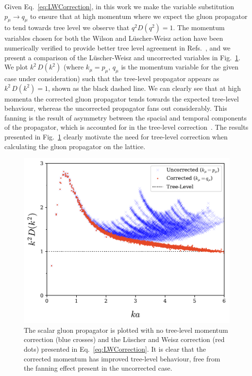 Given Eq.~\eqref{eq:LWCorrection}, in this work we make the variable substitution $p_\mu\rightarrow q_\mu$ to ensure that at high momentum where we expect the gluon propagator to tend towards tree level we observe that $q^2 D(q^2) = 1$. The momentum variables chosen for both the Wilson and L\"uscher-Weisz action have been numerically verified to provide better tree level agreement in Refs.~\cite{Marenzoni:1994ap, Bonnet:2001uh}, and we present a comparison of the L\"uscher-Weisz and uncorrected variables in Fig.~\ref{fig:MomentumComparison}. We plot $k^2\,D(k^2)$ (where $k_\mu=p_\mu,\,q_\mu$ is the momentum variable for the given case under consideration) such that the tree-level propagator appears as $k^2\,D(k^2)=1$, shown as the black dashed line. We can clearly see that at high momenta the corrected gluon propagator tends towards the expected tree-level behaviour, whereas the uncorrected propagator fans out considerably. This fanning is the result of asymmetry between the spacial and temporal components of the propagator, which is accounted for in the tree-level correction~\cite{Marenzoni:1994ap}. The results presented in Fig.~\ref{fig:MomentumComparison} clearly motivate the need for tree-level correction when calculating the gluon propagator on the lattice.\\
%
\begin{figure}[htb!]
\centering
\includegraphics[width=\linewidth]{./ScalarGluComp_q2_MomentumComparison.pdf}
\caption[The scalar gluon propagator is plotted with no tree-level momentum correction and the L\"uscher and Weisz correction.]{\label{fig:MomentumComparison} The scalar gluon propagator is plotted with no tree-level momentum correction (blue crosses) and the L\"uscher and Weisz correction (red dots) presented in Eq.~\eqref{eq:LWCorrection}. It is clear that the corrected momentum has improved tree-level behaviour, free from the fanning effect present in the uncorrected case.}
\end{figure}
%

